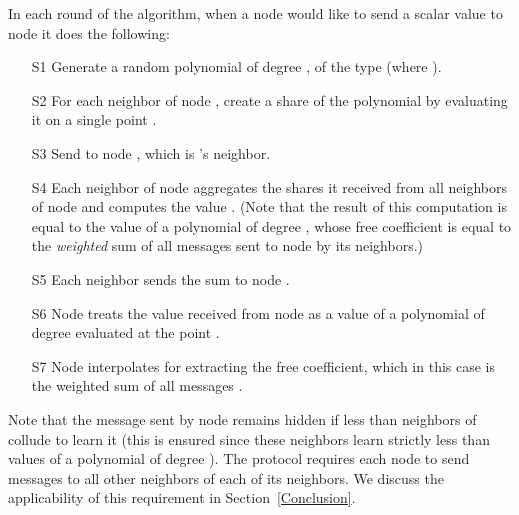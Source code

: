 \documentclass[times, 10pt,twocolumn]{article}
\begin{document}
In each round of the algorithm, when a node  would like to send
a scalar value  to node  it does the following:
\begin{itemize}
    \item [S1] Generate a random polynomial  of degree
    , of the type \/ (where ).
    \item [S2] For each neighbor  of node , create a share  of
    the polynomial  by evaluating it on a single point
    .
    \item [S3] Send  to node , which is 's
    neighbor.
\item [S4] Each neighbor  of node  aggregates the
      shares it received from all neighbors of node   and computes the value
 . (Note
 that the result of this computation is equal to the value of a polynomial of degree ,
 whose free coefficient is equal to the {\em weighted} sum of all messages sent to
 node  by its neighbors.)
    \item [S5] Each neighbor  sends the sum  to node .
    \item [S6] Node  treats the value received from node  as a
      value of a polynomial of degree  evaluated at the point
      .
    \item [S7] Node  interpolates  for extracting the
    free coefficient, which in this case is the weighted sum of all
    messages .
\end{itemize}


Note that the message  sent by node  remains hidden
if less than   neighbors of  collude to learn
it (this is ensured since these neighbors learn strictly less than  values
of a polynomial of degree ).
The protocol requires each node  to send messages to
all other
neighbors of each of its neighbors. We discuss the applicability of this requirement in
Section~\ref{Conclusion}.

\end{document}
